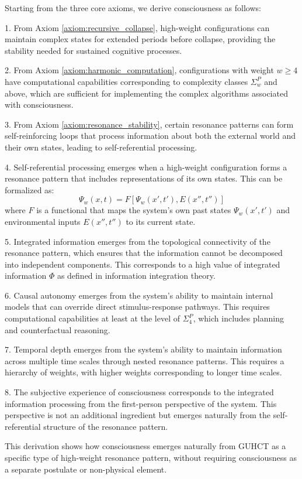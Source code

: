 \documentclass[11pt,a4paper]{article}
\makeatletter
\renewenvironment{proof}[1][\proofname]{\par
  \pushQED{\qed}%
  \normalfont \topsep6\p@\@plus6\p@\relax
  \trivlist
  \item[\hskip\labelsep
        \itshape
    #1\@addpunct{.}]\ignorespaces
}{%
  \popQED\endtrivlist\@endpefalse
}
\makeatother
\begin{document}
\begin{proof}
Starting from the three core axioms, we derive consciousness as follows:

1. From Axiom \ref{axiom:recursive_collapse}, high-weight configurations can maintain complex states for extended periods before collapse, providing the stability needed for sustained cognitive processes.

2. From Axiom \ref{axiom:harmonic_computation}, configurations with weight $w \geq 4$ have computational capabilities corresponding to complexity classes $\Sigma_w^P$ and above, which are sufficient for implementing the complex algorithms associated with consciousness.

3. From Axiom \ref{axiom:resonance_stability}, certain resonance patterns can form self-reinforcing loops that process information about both the external world and their own states, leading to self-referential processing.

4. Self-referential processing emerges when a high-weight configuration forms a resonance pattern that includes representations of its own states. This can be formalized as:
   \begin{equation}
   \Psi_w(x,t) = F[\Psi_w(x',t'), E(x'',t'')]
   \end{equation}
   where $F$ is a functional that maps the system's own past states $\Psi_w(x',t')$ and environmental inputs $E(x'',t'')$ to its current state.

5. Integrated information emerges from the topological connectivity of the resonance pattern, which ensures that the information cannot be decomposed into independent components. This corresponds to a high value of integrated information $\Phi$ as defined in information integration theory.

6. Causal autonomy emerges from the system's ability to maintain internal models that can override direct stimulus-response pathways. This requires computational capabilities at least at the level of $\Sigma_4^P$, which includes planning and counterfactual reasoning.

7. Temporal depth emerges from the system's ability to maintain information across multiple time scales through nested resonance patterns. This requires a hierarchy of weights, with higher weights corresponding to longer time scales.

8. The subjective experience of consciousness corresponds to the integrated information processing from the first-person perspective of the system. This perspective is not an additional ingredient but emerges naturally from the self-referential structure of the resonance pattern.

This derivation shows how consciousness emerges naturally from GUHCT as a specific type of high-weight resonance pattern, without requiring consciousness as a separate postulate or non-physical element.
\end{proof}
\end{document}
